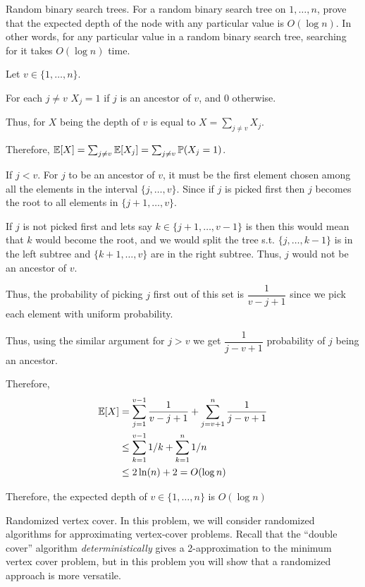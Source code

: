 \documentclass[12pt, letterpaper]{article}
\renewcommand{\P}{\mathbb{P}}
\begin{document}
\begin{problem}{Random binary search trees.}
  For a random binary search tree on $1, \ldots, n$, prove that the expected depth of the node with any particular value is $O(\log n)$.
  In other words, for any particular value in a random binary search tree, searching for it takes $O(\log n)$ time.
\end{problem}
\begin{problemproof}
  Let $v \in \{1,\dots,n\}$.

  For each $j \neq v$ $X_j=1$ if $j$ is an ancestor of $v$, and 0 otherwise.

  Thus, for $X$ being the depth of $v$ is equal to $X=\sum_{j \neq v} X_j$.

  Therefore, $\E[X]=\sum_{j \neq v}\E[X_j]=\sum_{j \neq v} \P(X_j = 1)$.

  If $j < v$. For $j$ to be an ancestor of $v$, it must be the first element chosen among all the elements in the interval $\{j,\dots,v\}$. Since if $j$ is picked first then $j$ becomes the root to all elements in $\{j+1,\dots,v\}$.

  If $j$ is not picked first and lets say $k \in \{j+1,\dots,v-1\}$ is then this would mean that $k$ would become the root, 
  and we would split the tree s.t. $\{j,\dots,k-1\}$ is in the left subtree and $\{k+1,\dots,v\}$ are in the right subtree. Thus, $j$ would not be an ancestor of $v$.

  Thus, the probability of picking $j$ first out of this set is $\dfrac{1}{v-j+1}$ since we pick each element with uniform probability.

  Thus, using the similar argument for $j > v$ we get $\dfrac{1}{j-v+1}$ probability of $j$ being an ancestor.

  Therefore,
  \begin{align*}
    \mathbb{E}[X]&=\sum_{j=1}^{v-1}\dfrac{1}{v-j+1} + \sum_{j=v+1}^n \dfrac{1}{j-v+1}\\
         &\leq \sum_{k=1}^{v-1} 1/k + \sum_{k=1}^n 1/n\\
         &\leq 2\ln(n)+2 = O(\log n)
  \end{align*}

  Therefore, the expected depth of $v \in \{1,\dots,n\}$ is $O(\log n)$
\end{problemproof}

\begin{problem}{Randomized vertex cover.}
  In this problem, we will consider randomized algorithms for approximating vertex-cover problems. Recall that the ``double cover'' algorithm \emph{deterministically} gives a 2-approximation to the minimum vertex cover problem, but in this problem you will show that a randomized approach is more versatile.
\end{problem}
\end{document}
